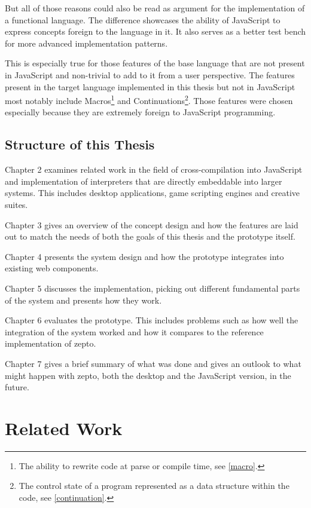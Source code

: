 \documentclass[oneside,11pt,xetex]{scrbook}
\begin{document}
But all of those reasons could also be read as argument for the implementation
of a functional language. The difference showcases the ability of JavaScript
to express concepts foreign to the language in it. It also serves as a better
test bench for more advanced implementation patterns.

This is especially true for those features of the base language that are not
present in JavaScript and non-trivial to add to it from a user perspective.
The features present in the target language implemented in this thesis but not
in JavaScript most notably include Macros\footnote{The ability to rewrite
code at parse or compile time, see \ref{macro}.} and Continuations\footnote{The
control state of a program represented as a data structure within the code, see
\ref{continuation}.}. Those features were chosen especially because they are
extremely foreign to JavaScript programming.

\section{Structure of this Thesis}

Chapter 2 examines related work in the field of cross-compilation into JavaScript and implementation
of interpreters that are directly embeddable into larger systems. This includes desktop applications,
game scripting engines and creative suites.

Chapter 3 gives an overview of the concept design and how the features are laid out to match the needs
of both the goals of this thesis and the prototype itself.

Chapter 4 presents the system design and how the prototype integrates into existing web components.

Chapter 5 discusses the implementation, picking out different fundamental parts of the system and
presents how they work.

Chapter 6 evaluates the prototype. This includes problems such as how well the integration of the
system worked and how it compares to the reference implementation of zepto.

Chapter 7 gives a brief summary of what was done and gives an outlook to what might happen with
zepto, both the desktop and the JavaScript version, in the future.

\chapter{Related Work}
\label{chap:RelatedWork}
\end{document}
